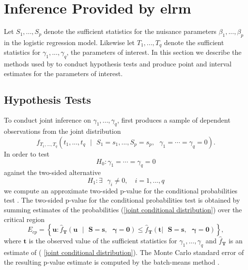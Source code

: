 \documentclass[article, shortnames]{jss}
\begin{document}
\section{Inference Provided by elrm} \label{Inference provided by elrm}

Let $S_{1},...,S_{p}$ denote the sufficient statistics for the
nuisance parameters $\beta_{1},...,\beta _{p}$ in the logistic
regression model. Likewise let $T_{1},...,T_{q}$ denote the
sufficient statistics for $\gamma _{1},...,\gamma _{q}$, the
parameters of interest. In this section we describe the methods
used by  to conduct hypothesis tests and produce point
and interval estimates for the parameters of interest.

\subsection{Hypothesis Tests}

To conduct joint inference on $\gamma _{1},...,\gamma _{q}$,
 first produces a sample of dependent observations from
the joint distribution
\begin{equation}
f_{T_{1},...,T_{q}}\left( t_{1},...,t_{q}\text{ }|\text{ }%
S_{1}=s_{1},...,S_{p}=s_{p},\text{ }\gamma _{1}=\cdots =\gamma
_{q}=0\right) \text{.}  \label{joint conditional distribution}
\end{equation}
In order to test
\begin{equation*}
H_{0}:\gamma _{1}=\cdots =\gamma _{q}=0
\end{equation*}
against the two-sided alternative%
\begin{equation*}
H_{1}:\exists \text{ }\gamma _{i}\neq 0,\quad i=1,...,q
\end{equation*}
we compute an approximate two-sided p-value for the conditional
probabilities test \citep[e.g.][]{Mehta:1995}. The two-sided
p-value for the conditional probabilities test is obtained by
summing estimates of the probabilities
(\ref{joint conditional distribution}) over
the critical region
\begin{equation*}
E_{cp}=\left\{ \mathbf{u}:\hat{f}_{\mathbf{T}}\left( \mathbf{u}\text{ }|%
\text{ }\mathbf{S=s},\text{ }\mathbf{\gamma }=\mathbf{0}\right) \leq \hat{f}%
_{\mathbf{T}}\left( \mathbf{t}|\text{ }\mathbf{S=s},\text{ }\mathbf{\gamma }=%
\mathbf{0}\right) \right\} ,
\end{equation*}
where $\mathbf{t}$ is the observed value of the sufficient statistics for $%
\gamma _{1},...,\gamma _{q}$ and $\hat{f}_{\mathbf{T}}$ is an estimate of (%
\ref{joint conditional distribution}). The Monte Carlo standard
error of the resulting p-value estimate is computed by the
batch-means method \citep[e.g.][]{Geyer:1992}.
\end{document}
